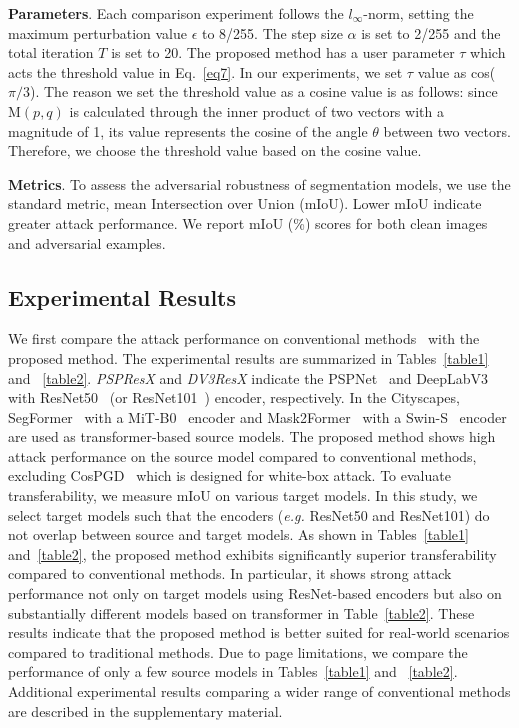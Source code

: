 \noindent\noindent\textbf{Parameters}. Each comparison experiment follows the $l_\infty$-norm, setting the maximum perturbation value $\epsilon$ to 8/255. The step size $\alpha$ is set to 2/255 and the total iteration $T$ is set to 20. The proposed method has a user parameter $\tau$ which acts the threshold value in Eq.~\ref{eq7}. In our experiments, we set $\tau$ value as cos($\pi/3$). The reason we set the threshold value as a cosine value is as follows: since $\textrm{M}(p,q)$ is calculated through the inner product of two vectors with a magnitude of 1, its value represents the cosine of the angle $\theta$ between two vectors. Therefore, we choose the threshold value based on the cosine value. 

\noindent
\textbf{Metrics}. To assess the adversarial robustness of segmentation models, we use the standard metric, mean Intersection over Union (mIoU). Lower mIoU indicate greater attack performance. We report mIoU (\%) scores for both clean images and adversarial examples.



\subsection{Experimental Results}
\label{sec4.2:Expresult}
We first compare the attack performance on conventional methods~\cite{agnihotri2024cospgd, gu2022segpgd, mkadry2017towards, xie2017adversarial, lin2019nesterov, xie2019improving, dong2019evading} with the proposed method. The experimental results are summarized in Tables~\ref{table1} and ~\ref{table2}. \textit{PSPResX} and \textit{DV3ResX} indicate the PSPNet~\cite{zhao2017pyramid} and DeepLabV3~\cite{chen2017rethinking} with ResNet50~\cite{he2016deep} (or ResNet101~\cite{he2016deep}) encoder, respectively. In the Cityscapes, SegFormer~\cite{xie2021segformer} with a MiT-B0~\cite{xie2021segformer} encoder and Mask2Former~\cite{cheng2022masked} with a Swin-S~\cite{liu2021swin} encoder are used as transformer-based source models.
The proposed method shows high attack performance on the source model compared to conventional methods, excluding CosPGD~\cite{agnihotri2024cospgd} which is designed for white-box attack. To evaluate transferability, we measure mIoU on various target models. In this study, we select target models such that the encoders (\textit{e.g.} ResNet50 and ResNet101) do not overlap between source and target models. As shown in Tables~\ref{table1} and~\ref{table2}, the proposed method exhibits significantly superior transferability compared to conventional methods. In particular, it shows strong attack performance not only on target models using ResNet-based encoders but also on substantially different models based on transformer in Table~\ref{table2}. These results indicate that the proposed method is better suited for real-world scenarios compared to traditional methods. Due to page limitations, we compare the performance of only a few source models in Tables~\ref{table1} and ~\ref{table2}. Additional experimental results comparing a wider range of conventional methods are described in the supplementary material.


